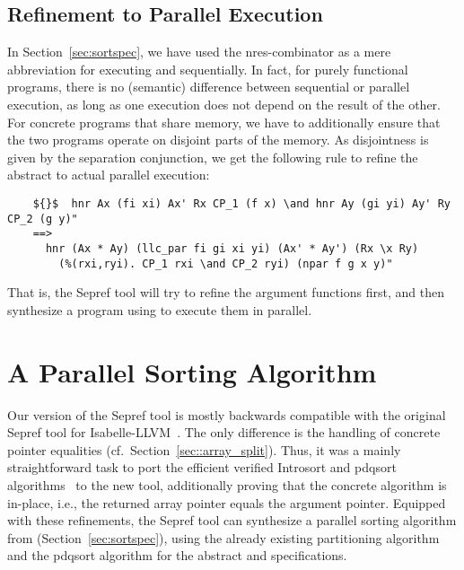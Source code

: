 \documentclass[runningheads]{llncs}
\begin{document}
  \subsection{Refinement to Parallel Execution}
  In Section~\ref{sec:sortspec}, we have used the nres-combinator  as a
  mere abbreviation for executing  and  sequentially. In fact, for purely functional
  programs, there is no (semantic) difference between sequential or parallel execution,
  as long as one execution does not depend on the result of the other. For concrete programs that share memory,
  we have to additionally ensure that the two programs operate on disjoint parts of the memory.
  As disjointness is given by the separation conjunction, we get the following rule to refine the abstract 
  to actual parallel execution:
  \begin{lstlisting}
    ${}$  hnr Ax (fi xi) Ax' Rx CP_1 (f x) \and hnr Ay (gi yi) Ay' Ry CP_2 (g y)"
    ==>
      hnr (Ax * Ay) (llc_par fi gi xi yi) (Ax' * Ay') (Rx \x Ry)
        (%(rxi,ryi). CP_1 rxi \and CP_2 ryi) (npar f g x y)"
  \end{lstlisting}
  That is, the Sepref tool will try to refine the argument functions first, and then synthesize a program
  using  to execute them in parallel.


  \section{A Parallel Sorting Algorithm}\label{sec:parsort}
  Our version of the Sepref tool is mostly backwards compatible with the original Sepref tool for Isabelle-LLVM~\cite{La19-llvm}.
  The only difference is the handling of concrete pointer equalities (cf.\ Section~\ref{sec::array_split}).
  Thus, it was a mainly straightforward task to port the efficient verified Introsort and pdqsort algorithms~\cite{La20} to the new tool,
  additionally proving that the concrete algorithm is in-place, i.e., the returned array pointer equals the argument pointer.
  Equipped with these refinements, the Sepref tool can synthesize a parallel sorting algorithm from  (Section~\ref{sec:sortspec}), using the already existing partitioning algorithm and the
  pdqsort algorithm for the abstract  and  specifications.
\end{document}
